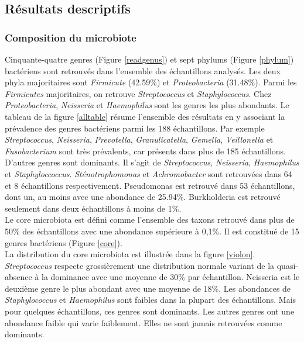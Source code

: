 \documentclass[12pt,a4paper]{article}
\begin{document}
\subsection{Résultats descriptifs}
\subsubsection{Composition du microbiote}
Cinquante-quatre genres (Figure \ref{readgenus}) et sept phylums (Figure \ref{phylum}) bactériens sont retrouvés dans l'ensemble des échantillons analysés. 
Les deux phyla majoritaires sont \textit{Firmicute} (42.59\%) et \textit{Proteobacteria} (31.48\%). Parmi les \textit{Firmicutes} majoritaires, on retrouve \textit{Streptococcus} et \textit{Staphylococcus}. Chez \textit{Proteobacteria}, \textit{Neisseria} et \textit{Haemophilus} sont les genres les plus abondants.
Le tableau de la figure \ref{alltable} résume l'ensemble des résultats en y associant la prévalence des genres bactériens parmi les 188 échantillons.
Par exemple \textit{Streptococcus}, \textit{Neisseria}, \textit{Prevotella}, \textit{Granulicatella}, \textit{Gemella}, \textit{Veillonella} et \textit{Fusobacterium} sont très prévalents, car présents dans plus de 185 échantillons.
D’autres genres sont dominants. Il s’agit de \textit{Streptococcus}, \textit{Neisseria}, \textit{Haemophilus} et \textit{Staphyloccoccus}. \textit{Sténotrophomonas} et \textit{Achromobacter} sont retrouvées dans 64 et 8 échantillons respectivement. Pseudomonas est retrouvé dans 53 échantillons, dont un, au moins avec une abondance de 25.94\%. Burkholderia est retrouvé seulement dans deux échantillons à moins de 1\%.\\
Le core microbiota\cite{VanderGast2011} est défini comme l'ensemble des taxons retrouvé dans plus de 50\% des échantillons avec une abondance supérieure à 0,1\%. Il est constitué de 15 genres bactériens (Figure \ref{core}).\\
La distribution du core microbiota est illustrée dans la figure \ref{violon}.
\textit{Streptococcus} respecte grossièrement une distribution normale variant de la quasi-absence à la dominance avec une moyenne de 30\% par échantillon. Neisseria est le deuxième genre le plus abondant avec une moyenne de 18\%.
Les abondances de \textit{Staphylococcus} et \textit{Haemophilus} sont faibles dans la plupart des échantillons. Mais pour quelques échantillons, ces genres sont dominants. Les autres genres ont une abondance faible qui varie faiblement. Elles ne sont jamais retrouvées comme dominants.
\end{document}
